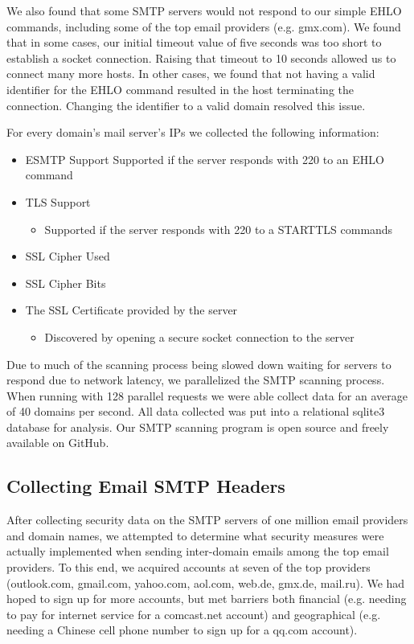 We also found that some SMTP servers would not respond to our simple EHLO 
commands, including some of the top email providers (e.g. gmx.com).  We found 
that in some cases, our initial timeout value of five seconds was too short to 
establish a socket connection.  Raising that timeout to 10 seconds allowed us to 
connect many more hosts.  In other cases, we found that not having a valid 
identifier for the EHLO command resulted in the host terminating the connection. 
Changing the identifier to a valid domain resolved this issue.

For every domain’s mail server’s IPs we collected the following information:
\lstset{breaklines=true}
\begin{itemize}
    \item ESMTP Support
        Supported if the server responds with 220 to an EHLO command
    \item TLS Support
    \begin{itemize}
        \item Supported if the server responds with 220 to a STARTTLS commands
    \end{itemize}
    \item SSL Cipher Used
    \item SSL Cipher Bits
    \item The SSL Certificate provided by the server
    \begin{itemize}
        \item Discovered by opening a secure socket connection to the server
    \end{itemize}
\end{itemize}

Due to much of the scanning process being slowed down waiting for servers to 
respond due to network latency, we parallelized the SMTP scanning process. When 
running with 128 parallel requests we were able collect data for an average of 
40 domains per second.  All data collected was put into a relational sqlite3 
database for analysis. Our SMTP scanning program is open source and freely 
available on GitHub\cite{code}.

\subsection{Collecting Email SMTP Headers}
After collecting security data on the SMTP servers of one million email 
providers and domain names, we attempted to determine what security measures 
were actually implemented when sending inter-domain emails among the top email 
providers.  To this end, we acquired accounts at seven of the top providers 
(outlook.com, gmail.com, yahoo.com, aol.com, web.de, gmx.de, mail.ru).  We had 
hoped to sign up for more accounts, but met barriers both financial (e.g. 
needing to pay for internet service for a comcast.net account) and geographical 
(e.g. needing a Chinese cell phone number to sign up for a qq.com account).

